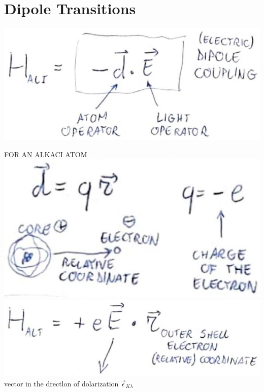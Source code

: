 \documentclass[10pt]{article}
\begin{document}
\section*{Dipole Transitions}
\begin{center}
\includegraphics[max width=\textwidth]{2025_10_16_22329e0f50bdd2511b17g-13(1)}
\end{center}

FOR AN ALKACI ATOM\\
\includegraphics[max width=\textwidth, center]{2025_10_16_22329e0f50bdd2511b17g-13(2)}\\
\includegraphics[max width=\textwidth, center]{2025_10_16_22329e0f50bdd2511b17g-13}\\
vector in the drectlon of dolarization $\vec{\epsilon}_{K \lambda}$
\end{document}
